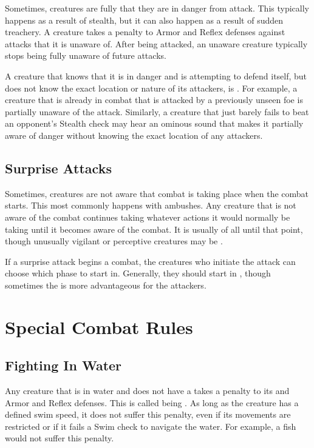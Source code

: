   Sometimes, creatures are fully \unaware that they are in danger from attack.
  This typically happens as a result of stealth, but it can also happen as a result of sudden treachery.
  A creature takes a  penalty to Armor and Reflex defenses against attacks that it is unaware of.
  After being attacked, an unaware creature typically stops being fully unaware of future attacks.

  A creature that knows that it is in danger and is attempting to defend itself, but does not know the exact location or nature of its attackers, is \partiallyunaware.
  For example, a creature that is already in combat that is attacked by a previously unseen foe is partially unaware of the attack.
  Similarly, a creature that just barely fails to beat an opponent's Stealth check may hear an ominous sound that makes it partially aware of danger without knowing the exact location of any attackers.

  \subsection{Surprise Attacks}\label{Surprise Attacks}
    Sometimes, creatures are not aware that combat is taking place when the combat starts.
    This most commonly happens with ambushes.
    Any creature that is not aware of the combat continues taking whatever actions it would normally be taking until it becomes aware of the combat.
    It is usually \unaware of all until that point, though unusually vigilant or perceptive creatures may be \partiallyunaware.

    If a surprise attack begins a combat, the creatures who initiate the attack can choose which phase to start in.
    Generally, they should start in , though sometimes the  is more advantageous for the attackers.

\section{Special Combat Rules}

  \subsection{Fighting In Water}\label{Fighting In Water}
    Any creature that is in water and does not have a  takes a  penalty to its  and Armor and Reflex defenses.
    This is called being .
    As long as the creature has a defined swim speed, it does not suffer this penalty, even if its movements are restricted or if it fails a Swim check to navigate the water.
    For example, a \grappled fish would not suffer this penalty.

